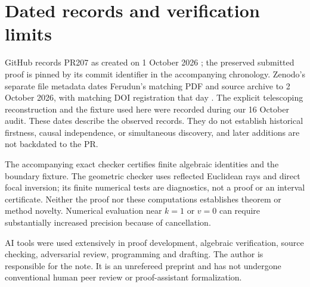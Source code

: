 \documentclass[11pt,letterpaper]{article}
\begin{document}
\section{Dated records and verification limits}
GitHub records PR207 as created on 1 October 2026
\cite{pr207}; the preserved submitted proof is pinned by its commit
identifier in the accompanying chronology. Zenodo's separate
file metadata dates Ferudun's matching PDF and source archive to
2 October 2026, with matching DOI registration that day
\cite{ferudun}. The explicit telescoping reconstruction and the
fixture used here were recorded during our 16 October audit.
These dates describe the observed records. They do not establish
historical firstness, causal independence, or simultaneous discovery,
and later additions are not backdated to the PR.

The accompanying exact checker certifies finite algebraic identities
and the boundary fixture. The geometric checker uses reflected
Euclidean rays and direct focal inversion; its finite numerical
tests are diagnostics, not a proof or an interval certificate.
Neither the proof nor these computations establishes theorem or
method novelty. Numerical evaluation near $k=1$ or $v=0$ can require
substantially increased precision because of cancellation.

AI tools were used extensively in proof development, algebraic
verification, source checking, adversarial review, programming and
drafting. The author is responsible for the note. It is an
unrefereed preprint and has not undergone conventional human
peer review or proof-assistant formalization.
\end{document}

